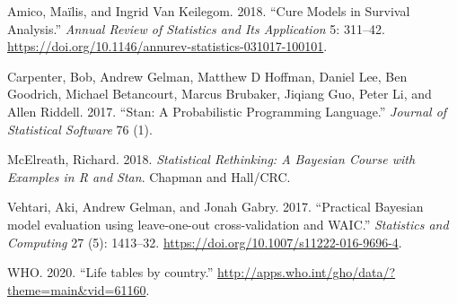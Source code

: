 \documentclass[
]{article}
\newlength{\cslhangindent}
\newlength{\cslentryspacingunit} %
\newenvironment{CSLReferences}[2] %
 {%
  \setlength{\parindent}{0pt}
  \ifodd #1
  \let\oldpar\par
  \def\par{\hangindent=\cslhangindent\oldpar}
  \fi
  \setlength{\parskip}{#2\cslentryspacingunit}
 }%
 {}
\begin{document}
\hypertarget{refs}{}
\begin{CSLReferences}{1}{0}
\leavevmode{}%
Amico, Maïlis, and Ingrid Van Keilegom. 2018. {``{Cure Models in
Survival Analysis}.''} \emph{Annual Review of Statistics and Its
Application} 5: 311--42.
\url{https://doi.org/10.1146/annurev-statistics-031017-100101}.

\leavevmode{}%
Carpenter, Bob, Andrew Gelman, Matthew D Hoffman, Daniel Lee, Ben
Goodrich, Michael Betancourt, Marcus Brubaker, Jiqiang Guo, Peter Li,
and Allen Riddell. 2017. {``Stan: A Probabilistic Programming
Language.''} \emph{Journal of Statistical Software} 76 (1).

\leavevmode{}%
McElreath, Richard. 2018. \emph{{Statistical Rethinking: A Bayesian
Course with Examples in R and Stan}}. Chapman and Hall/CRC.

\leavevmode{}%
Vehtari, Aki, Andrew Gelman, and Jonah Gabry. 2017. {``{Practical
Bayesian model evaluation using leave-one-out cross-validation and
WAIC}.''} \emph{Statistics and Computing} 27 (5): 1413--32.
\url{https://doi.org/10.1007/s11222-016-9696-4}.

\leavevmode{}%
WHO. 2020. {``{Life tables by country}.''}
\url{http://apps.who.int/gho/data/?theme=main\&vid=61160}.

\end{CSLReferences}
\end{document}

